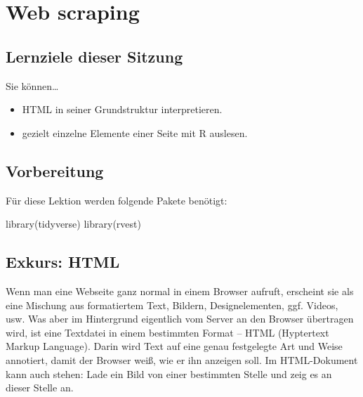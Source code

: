 \documentclass[
  ngerman,
]{article}
\newenvironment{Shaded}{\begin{snugshade}}{\end{snugshade}}
\newcommand{\FunctionTok}[1]{\textcolor[rgb]{0.00,0.00,0.00}{#1}}
\newcommand{\NormalTok}[1]{#1}
\providecommand{\tightlist}{%
  \setlength{\itemsep}{0pt}\setlength{\parskip}{0pt}}
\begin{document}
\hypertarget{web-scraping}{%
\section{Web scraping}\label{web-scraping}}

\hypertarget{lernziele-dieser-sitzung-4}{%
\subsection{Lernziele dieser Sitzung}\label{lernziele-dieser-sitzung-4}}

Sie können\ldots{}

\begin{itemize}
\tightlist
\item
  HTML in seiner Grundstruktur interpretieren.
\item
  gezielt einzelne Elemente einer Seite mit R auslesen.
\end{itemize}

\hypertarget{vorbereitung-3}{%
\subsection{Vorbereitung}\label{vorbereitung-3}}

Für diese Lektion werden folgende Pakete benötigt:

\begin{Shaded}
\begin{Highlighting}[]
\FunctionTok{library}\NormalTok{(tidyverse)}
\FunctionTok{library}\NormalTok{(rvest)}
\end{Highlighting}
\end{Shaded}

\hypertarget{exkurs-html}{%
\subsection{Exkurs: HTML}\label{exkurs-html}}

Wenn man eine Webseite ganz normal in einem Browser aufruft, erscheint sie als eine Mischung aus formatiertem Text, Bildern, Designelementen, ggf. Videos, usw. Was aber im Hintergrund eigentlich vom Server an den Browser übertragen wird, ist eine Textdatei in einem bestimmten Format -- HTML (Hyptertext Markup Language). Darin wird Text auf eine genau festgelegte Art und Weise annotiert, damit der Browser weiß, wie er ihn anzeigen soll. Im HTML-Dokument kann auch stehen: Lade ein Bild von einer bestimmten Stelle und zeig es an dieser Stelle an.
\end{document}
